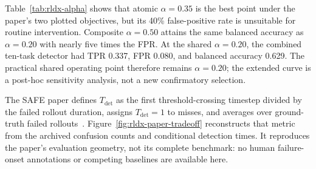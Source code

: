 \documentclass[11pt,a4paper]{article}
\begin{document}
\begin{table}[H]
\centering
\caption{Task-normalized RLDX MLP operating points. Accuracy is ordinary accuracy; balanced accuracy is the primary metric because each type-specific evaluation set contains 40 failures and 25 successes per seed.}
\label{tab:rldx-alpha}
\end{table}

Table~\ref{tab:rldx-alpha} shows that atomic $\alpha=0.35$ is the best point
under the paper's two plotted objectives, but its 40\% false-positive rate is
unsuitable for routine intervention. Composite $\alpha=0.50$ attains the same
balanced accuracy as $\alpha=0.20$ with nearly five times the FPR. At the
shared $\alpha=0.20$, the combined ten-task detector had TPR 0.337, FPR 0.080,
and balanced accuracy 0.629. The practical shared operating point therefore
remains $\alpha=0.20$; the extended curve is a post-hoc sensitivity analysis,
not a new confirmatory selection.

The SAFE paper defines $T_{\mathrm{det}}$ as the first threshold-crossing timestep divided by the failed rollout duration, assigns $T_{\mathrm{det}}=1$ to misses, and averages over ground-truth failed rollouts~\cite{gu2026safe}. Figure~\ref{fig:rldx-paper-tradeoff} reconstructs that metric from the archived confusion counts and conditional detection times. It reproduces the paper's evaluation geometry, not its complete benchmark: no human failure-onset annotations or competing baselines are available here.
\end{document}
